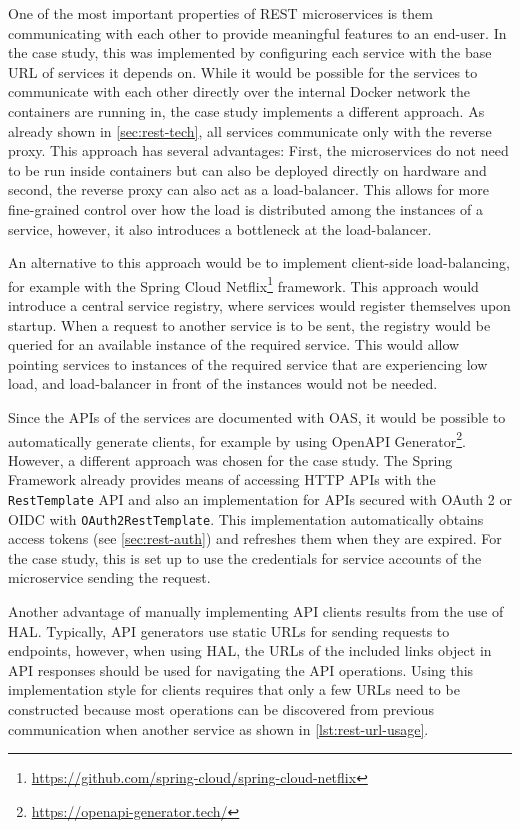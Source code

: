 One of the most important properties of \ac{REST} microservices is them communicating with each other to provide meaningful features to an end-user.
In the case study, this was implemented by configuring each service with the base \ac{URL} of services it depends on.
While it would be possible for the services to communicate with each other directly over the internal Docker network the containers are running in, the case study implements a different approach.
As already shown in \autoref{sec:rest-tech}, all services communicate only with the reverse proxy.
This approach has several advantages:
First, the microservices do not need to be run inside containers but can also be deployed directly on hardware and second, the reverse proxy can also act as a load-balancer.
This allows for more fine-grained control over how the load is distributed among the instances of a service, however, it also introduces a bottleneck at the load-balancer.

An alternative to this approach would be to implement client-side load-balancing, for example with the Spring Cloud Netflix\footnote{\url{https://github.com/spring-cloud/spring-cloud-netflix}} framework.
This approach would introduce a central service registry, where services would register themselves upon startup.
When a request to another service is to be sent, the registry would be queried for an available instance of the required service.
This would allow pointing services to instances of the required service that are experiencing low load, and load-balancer in front of the instances would not be needed.

Since the \acp{API} of the services are documented with \ac{OAS}, it would be possible to automatically generate clients, for example by using Open\ac{API} Generator\footnote{\url{https://openapi-generator.tech/}}.
However, a different approach was chosen for the case study.
The Spring Framework already provides means of accessing \ac{HTTP} \acp{API} with the \texttt{RestTemplate} \ac{API} and also an implementation for \acp{API} secured with OAuth 2 or \ac{OIDC} with \texttt{OAuth2RestTemplate}.
This implementation automatically obtains access tokens (see \autoref{sec:rest-auth}) and refreshes them when they are expired.
For the case study, this is set up to use the credentials for service accounts of the microservice sending the request.

Another advantage of manually implementing \ac{API} clients results from the use of \ac{HAL}.
Typically, \ac{API} generators use static \acp{URL} for sending requests to endpoints, however, when using \ac{HAL}, the \acp{URL} of the included links object in \ac{API} responses should be used for navigating the \ac{API} operations.
Using this implementation style for clients requires that only a few \acp{URL} need to be constructed because most operations can be discovered from previous communication when another service as shown in \autoref{lst:rest-url-usage}.

